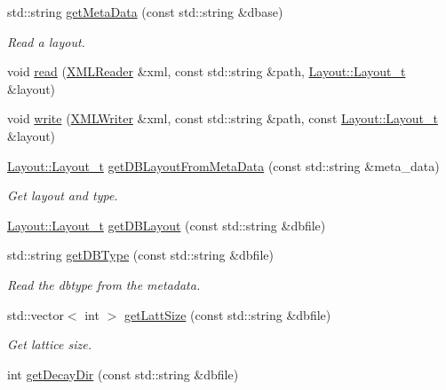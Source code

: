 \begin{DoxyCompactItemize}
std\+::string \mbox{\hyperlink{namespaceHadron_a6c9f3d44d269357faf4d786cc73ec742}{get\+Meta\+Data}} (const std\+::string \&dbase)
\begin{DoxyCompactList}\small\item\em Read a layout. \end{DoxyCompactList}\item 
void \mbox{\hyperlink{namespaceHadron_a2c6adb72eb12fa49cb7c0c7d15aa4aba}{read}} (\mbox{\hyperlink{classADATXML_1_1XMLReader}{X\+M\+L\+Reader}} \&xml, const std\+::string \&path, \mbox{\hyperlink{structHadron_1_1Layout_1_1Layout__t}{Layout\+::\+Layout\+\_\+t}} \&layout)
\item 
void \mbox{\hyperlink{namespaceHadron_ae327bbb04efa053f7be135b73bb596a7}{write}} (\mbox{\hyperlink{classADATXML_1_1XMLWriter}{X\+M\+L\+Writer}} \&xml, const std\+::string \&path, const \mbox{\hyperlink{structHadron_1_1Layout_1_1Layout__t}{Layout\+::\+Layout\+\_\+t}} \&layout)
\item 
\mbox{\hyperlink{structHadron_1_1Layout_1_1Layout__t}{Layout\+::\+Layout\+\_\+t}} \mbox{\hyperlink{namespaceHadron_a5f888183d0cbdadea2ebdf51020f5042}{get\+D\+B\+Layout\+From\+Meta\+Data}} (const std\+::string \&meta\+\_\+data)
\begin{DoxyCompactList}\small\item\em Get layout and type. \end{DoxyCompactList}\item 
\mbox{\hyperlink{structHadron_1_1Layout_1_1Layout__t}{Layout\+::\+Layout\+\_\+t}} \mbox{\hyperlink{namespaceHadron_af18d764aba83c32e26a22d75ed2dfbf7}{get\+D\+B\+Layout}} (const std\+::string \&dbfile)
\item 
std\+::string \mbox{\hyperlink{namespaceHadron_a82284ec1545a1a6b6794da8d973a1d57}{get\+D\+B\+Type}} (const std\+::string \&dbfile)
\begin{DoxyCompactList}\small\item\em Read the dbtype from the metadata. \end{DoxyCompactList}\item 
std\+::vector$<$ int $>$ \mbox{\hyperlink{namespaceHadron_aa639c858514f322eb7ee4c074924746a}{get\+Latt\+Size}} (const std\+::string \&dbfile)
\begin{DoxyCompactList}\small\item\em Get lattice size. \end{DoxyCompactList}\item 
int \mbox{\hyperlink{namespaceHadron_ae5c5e7cd57aa116ce56262bf00762610}{get\+Decay\+Dir}} (const std\+::string \&dbfile)

\end{DoxyCompactItemize}
